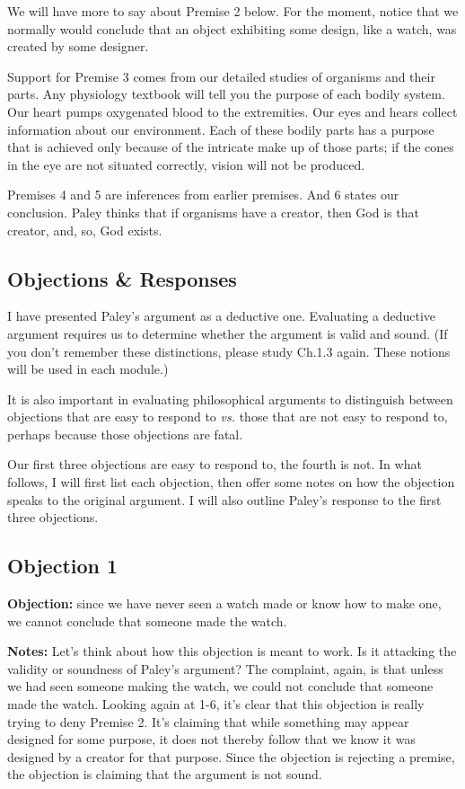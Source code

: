 \documentclass[]{article}
\begin{document}
We will have more to say about Premise 2 below. For the moment, notice
that we normally would conclude that an object exhibiting some design,
like a watch, was created by some designer.

Support for Premise 3 comes from our detailed studies of organisms and
their parts. Any physiology textbook will tell you the purpose of each
bodily system. Our heart pumps oxygenated blood to the extremities. Our
eyes and hears collect information about our environment. Each of these
bodily parts has a purpose that is achieved only because of the
intricate make up of those parts; if the cones in the eye are not
situated correctly, vision will not be produced.

Premises 4 and 5 are inferences from earlier premises. And 6 states our
conclusion. Paley thinks that if organisms have a creator, then God is
that creator, and, so, God exists.

\subsection{Objections \& Responses}\label{objections-responses}

I have presented Paley's argument as a deductive one. Evaluating a
deductive argument requires us to determine whether the argument is
valid and sound. (If you don't remember these distinctions, please study
Ch.1.3 again. These notions will be used in each module.)

It is also important in evaluating philosophical arguments to
distinguish between objections that are easy to respond to \emph{vs.}
those that are not easy to respond to, perhaps because those objections
are fatal.

Our first three objections are easy to respond to, the fourth is not. In
what follows, I will first list each objection, then offer some notes on
how the objection speaks to the original argument. I will also outline
Paley's response to the first three objections.

\subsection{Objection 1}\label{objection-1}

\textbf{Objection:} since we have never seen a watch made or know how to
make one, we cannot conclude that someone made the watch.

\textbf{Notes:} Let's think about how this objection is meant to work.
Is it attacking the validity or soundness of Paley's argument? The
complaint, again, is that unless we had seen someone making the watch,
we could not conclude that someone made the watch. Looking again at 1-6,
it's clear that this objection is really trying to deny Premise 2. It's
claiming that while something may appear designed for some purpose, it
does not thereby follow that we know it was designed by a creator for
that purpose. Since the objection is rejecting a premise, the objection
is claiming that the argument is not sound.
\end{document}
